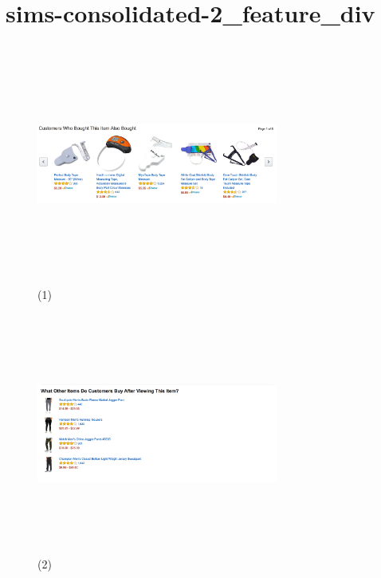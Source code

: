 \documentclass[12pt]{article}
\begin{document}
\section*{sims-consolidated-2\_feature\_div}
\begin{figure}[htp]
\centering
\includegraphics[width=300px,height=300px]{images/sims-consolidated-2_feature_div(1).png}
\caption{(1)}
\end{figure}
\begin{figure}[htp]
\centering
\includegraphics[width=300px,height=300px]{images/sims-consolidated-2_feature_div(2).png}
\caption{(2)}
\end{figure}

\pagebreak
\end{document}
